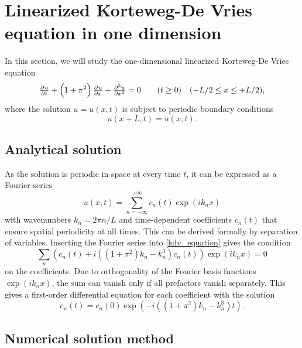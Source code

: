 \section{Linearized Korteweg-De Vries equation in one dimension}

In this section, we will study the one-dimensional linearized Korteweg-De Vries equation
\begin{equation}
\pd{u}{t} + \left(1+\pi^2\right)\pd{u}{x} + \pd[3]{u}{x} = 0 \qquad (t \geq 0) \quad (-L/2 \leq x \leq +L/2),
\label{kdv_equation}
\end{equation}
where the solution $u = u(x,t)$ is subject to periodic boundary conditions
\begin{equation*}
u(x+L, t) = u(x, t).
\end{equation*}

\subsection{Analytical solution}

As the solution is periodic in space at every time $t$, it can be expressed as a Fourier-series
\begin{equation}
u(x, t) = \sum_{n=-\infty}^{+\infty} c_n(t) \exp{(i k_n x)}
\label{fourier_series}
\end{equation}
with wavenumbers $k_n = 2 \pi n / L$ and time-dependent coefficients $c_n(t)$ that ensure spatial periodicity at all times.
This can be derived formally by separation of variables.
Inserting the Fourier series into \cref{kdv_equation} gives the condition
\begin{equation*}
	\sum_n \left( \dot{c}_n(t) + i \left( \left( 1+\pi^2 \right) k_n - k_n^3 \right) c_n(t) \right) \exp{(i k_n x)} = 0
\end{equation*}
on the coefficients.
Due to orthogonality of the Fourier basis functions $\exp(i k_n x)$, the sum can vanish only if all prefactors vanish separately.
This gives a first-order differential equation for each coefficient with the solution
\begin{equation}
	c_n(t) = c_n(0) \exp{\left( -i \left (\left(1+\pi^2\right)k_n - k_n^3\right) t \right) }.
	\label{fourier_coefficients}
\end{equation}

\subsection{Numerical solution method}

